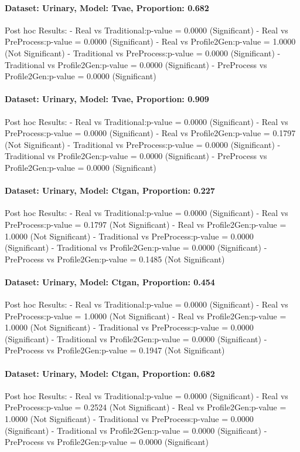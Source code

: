 \documentclass{article}
\theoremstyle{plain}
\theoremstyle{definition}
\theoremstyle{remark}
\begin{document}
\paragraph{Dataset: Urinary, Model: Tvae, Proportion: 0.682
}Post hoc Results:
- Real vs Traditional:p-value = 0.0000 (Significant)
- Real vs PreProcess:p-value = 0.0000 (Significant)
- Real vs Profile2Gen:p-value = 1.0000 (Not Significant)
- Traditional vs PreProcess:p-value = 0.0000 (Significant)
- Traditional vs Profile2Gen:p-value = 0.0000 (Significant)
- PreProcess vs Profile2Gen:p-value = 0.0000 (Significant)

\paragraph{Dataset: Urinary, Model: Tvae, Proportion: 0.909
}Post hoc Results:
- Real vs Traditional:p-value = 0.0000 (Significant)
- Real vs PreProcess:p-value = 0.0000 (Significant)
- Real vs Profile2Gen:p-value = 0.1797 (Not Significant)
- Traditional vs PreProcess:p-value = 0.0000 (Significant)
- Traditional vs Profile2Gen:p-value = 0.0000 (Significant)
- PreProcess vs Profile2Gen:p-value = 0.0000 (Significant)

\paragraph{Dataset: Urinary, Model: Ctgan, Proportion: 0.227
}Post hoc Results:
- Real vs Traditional:p-value = 0.0000 (Significant)
- Real vs PreProcess:p-value = 0.1797 (Not Significant)
- Real vs Profile2Gen:p-value = 1.0000 (Not Significant)
- Traditional vs PreProcess:p-value = 0.0000 (Significant)
- Traditional vs Profile2Gen:p-value = 0.0000 (Significant)
- PreProcess vs Profile2Gen:p-value = 0.1485 (Not Significant)

\paragraph{Dataset: Urinary, Model: Ctgan, Proportion: 0.454
}Post hoc Results:
- Real vs Traditional:p-value = 0.0000 (Significant)
- Real vs PreProcess:p-value = 1.0000 (Not Significant)
- Real vs Profile2Gen:p-value = 1.0000 (Not Significant)
- Traditional vs PreProcess:p-value = 0.0000 (Significant)
- Traditional vs Profile2Gen:p-value = 0.0000 (Significant)
- PreProcess vs Profile2Gen:p-value = 0.1947 (Not Significant)

\paragraph{Dataset: Urinary, Model: Ctgan, Proportion: 0.682
}Post hoc Results:
- Real vs Traditional:p-value = 0.0000 (Significant)
- Real vs PreProcess:p-value = 0.2524 (Not Significant)
- Real vs Profile2Gen:p-value = 1.0000 (Not Significant)
- Traditional vs PreProcess:p-value = 0.0000 (Significant)
- Traditional vs Profile2Gen:p-value = 0.0000 (Significant)
- PreProcess vs Profile2Gen:p-value = 0.0000 (Significant)
\end{document}
